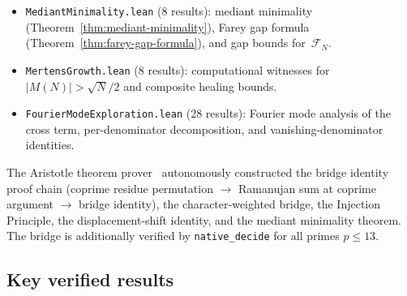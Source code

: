 \documentclass[11pt]{article}
\theoremstyle{definition}
\newcommand{\F}{\mathcal{F}}
\begin{document}
\begin{itemize}
    one~\texttt{sorry}): Sign Theorem for individual small primes
    ($p = 13, 19, 31$ verified by \texttt{native\_decide}), wobble
    monotonicity equivalence, correlation ratio $R(p) > -1/2$
    verified for all primes $11 \le p \le 83$,
    the structural theorem \texttt{bPlusC\_pos\_of\_corrRatio},
    exact values $R(11) = -1155/5974$ and $R(13) = 813/15872$,
    corrected ratio test (the original had a counterexample at $p = 7$),
    and the \texttt{dispRoughSquaredSum} definition showing
    Cauchy--Schwarz is too loose (44$\times$ gap).
    Remaining \texttt{sorry}: full Sign Theorem conjecture
    (\texttt{sign\_theorem\_conj}).
  \item \texttt{MediantMinimality.lean} (8 results):
    mediant minimality (Theorem~\ref{thm:mediant-minimality}),
    Farey gap formula (Theorem~\ref{thm:farey-gap-formula}),
    and gap bounds for~$\F_N$.
  \item \texttt{MertensGrowth.lean} (8 results):
    computational witnesses for $|M(N)| > \sqrt{N}/2$
    and composite healing bounds.
  \item \texttt{FourierModeExploration.lean} (28 results):
    Fourier mode analysis of the cross term, per-denominator
    decomposition, and vanishing-denominator identities.
\end{itemize}
The Aristotle theorem prover~\cite{Aristotle2025}
autonomously constructed the bridge identity proof chain
(coprime residue permutation $\to$ Ramanujan sum at coprime
argument $\to$ bridge identity), the character-weighted
bridge, the Injection Principle, the displacement-shift
identity, and the mediant minimality theorem.
The bridge is additionally verified by
\texttt{native\_decide} for all primes $p \le 13$.

\subsection{Key verified results}
\end{document}
